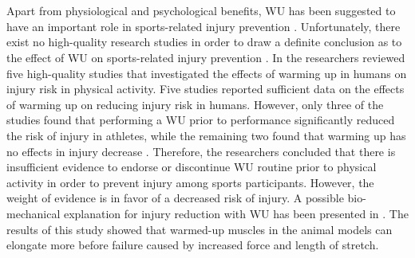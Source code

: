 \\\\Apart from physiological and psychological benefits, WU has been suggested to have an important role in sports-related injury prevention \cite{shellock1985warming}. Unfortunately, there exist no high-quality research studies in order to draw a definite conclusion as to the effect of WU on sports-related injury prevention \cite{fields2007should}. In \cite{fradkin2006does} the researchers reviewed five high-quality studies that investigated the effects of warming up in humans on injury risk in physical activity. Five studies reported sufficient data on the effects of warming up on reducing injury risk in humans. However, only three of the studies found that performing a WU prior to performance significantly reduced the risk of injury in athletes, while the remaining two found that warming up has no effects in injury decrease \cite{fradkin2006does}. Therefore, the researchers concluded that there is insufficient evidence to endorse or discontinue WU routine prior to physical activity in order to prevent injury among sports participants. However, the weight of evidence is in favor of a decreased risk of injury. A possible bio-mechanical explanation for injury reduction with WU has been presented in \cite{safran1989warm}. The results of this study showed that warmed-up muscles in the animal models can elongate more before failure caused by increased force and length of stretch.

